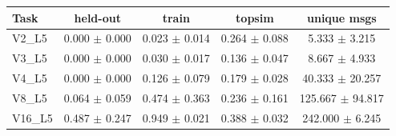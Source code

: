 \begin{tabular}{lcccc}
\toprule
Task & held-out & train & topsim & unique msgs \\
\midrule
V2\_L5 & 0.000 $\pm$ 0.000 & 0.023 $\pm$ 0.014 & 0.264 $\pm$ 0.088 & 5.333 $\pm$ 3.215 \\
V3\_L5 & 0.000 $\pm$ 0.000 & 0.030 $\pm$ 0.017 & 0.136 $\pm$ 0.047 & 8.667 $\pm$ 4.933 \\
V4\_L5 & 0.000 $\pm$ 0.000 & 0.126 $\pm$ 0.079 & 0.179 $\pm$ 0.028 & 40.333 $\pm$ 20.257 \\
V8\_L5 & 0.064 $\pm$ 0.059 & 0.474 $\pm$ 0.363 & 0.236 $\pm$ 0.161 & 125.667 $\pm$ 94.817 \\
V16\_L5 & 0.487 $\pm$ 0.247 & 0.949 $\pm$ 0.021 & 0.388 $\pm$ 0.032 & 242.000 $\pm$ 6.245 \\
\bottomrule
\end{tabular}
